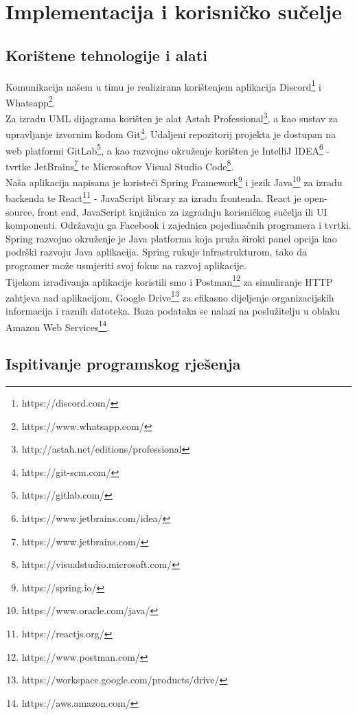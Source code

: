 
	
\chapter{Implementacija i korisničko sučelje}
		
		
		\section{Korištene tehnologije i alati}

		Komunikacija našem u timu je realizirana korištenjem aplikacija Discord\footnote{https://discord.com/} i Whatsapp\footnote{https://www.whatsapp.com/}.\\ Za izradu UML dijagrama korišten je alat Astah Professional\footnote{http://astah.net/editions/professional}, a kao sustav za upravljanje
izvornim kodom Git\footnote{https://git-scm.com/}. Udaljeni repozitorij projekta je dostupan na web platformi GitLab\footnote{https://gitlab.com/}, a kao razvojno okruženje korišten je IntelliJ IDEA\footnote{https://www.jetbrains.com/idea/} - tvrtke JetBrains\footnote{https://www.jetbrains.com/} te Microsoftov Visual Studio Code\footnote{https://visualstudio.microsoft.com/
}. 
	\\
	 Naša aplikacija napisana je koristeći Spring Framework\footnote{https://spring.io/} i jezik Java\footnote{https://www.oracle.com/java/} za izradu backenda te React\footnote{https://reactjs.org/} - JavaScript library za izradu frontenda. React je open-source, front end, JavaScript knjižnica za izgradnju korisničkog sučelja ili UI komponenti. Održavaju ga Facebook i zajednica pojedinačnih programera i tvrtki. Spring razvojno okruženje je Java platforma koja pruža široki panel opcija kao podrški
razvoju Java aplikacija. Spring rukuje infrastrukturom, tako da programer može usmjeriti svoj
fokus na razvoj aplikacije. \\
Tijekom izrađivanja aplikacije koristili smo i Postman\footnote{https://www.postman.com/} za simuliranje HTTP zahtjeva nad aplikacijom, Google Drive\footnote{https://workspace.google.com/products/drive/} za efikasno dijeljenje organizacijskih informacija i raznih datoteka. 
Baza podataka se nalazi na poslužitelju u oblaku Amazon
Web Services\footnote{https://aws.amazon.com/}.			
			
			\eject 
		
	
		\section{Ispitivanje programskog rješenja}
			

